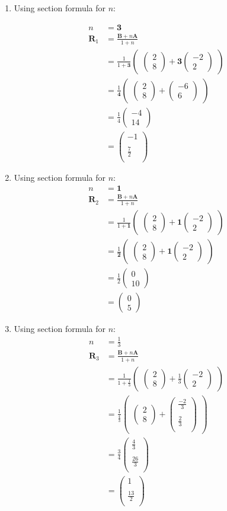 \documentclass[12pt]{article}
\newcommand{\myvec}[1]{\ensuremath{\begin{pmatrix}#1\end{pmatrix}}}
\let\vec\mathbf
\begin{document}
\begin{enumerate}

\item Using section formula for $n$:
    
\begin{align}
n&=\vec{3}\\
\vec{R}_1&=\frac{\vec{B}+n\vec{A}}{1+n}\\
&=\frac{1}{1+\vec{3}}  \myvec{\myvec{
2\\
8
}
  +
   \vec{3}\myvec{
-2\\
2
}}\\
&= \frac{1}{\vec{4}} \myvec{\myvec{
2\\
8
}
  +
\myvec{
-6\\
6
}} \\
&=\frac{1}{4}
\myvec{
-4\\
14
}\\
&=\myvec{
-1\\
\\
\frac{7}{2}\\
}
\end{align}

\item Using section formula for $n$:
\begin{align}
n&=\vec{1}\\
\vec{R}_2&=\frac{\vec{B}+n\vec{A}}{1+n}\\
&=\frac{1}{1+\vec{1}}  \myvec{\myvec{
2\\
8
}
  +
   \vec{1}\myvec{
-2\\
2
}}\\
&= \frac{1}{\vec{2}} \myvec{\myvec{
2\\
8
}
  +
\vec{1}\myvec{
-2\\
2
}} \\
&=\frac{1}{2}
\myvec{
0\\
10
}\\
&=\myvec{
0\\
5
}
\end{align}

\item Using section formula for $n$:
\begin{align}
n&=\frac{1}{3}\\
\vec{R}_3&=\frac{\vec{B}+n\vec{A}}{1+n}\\
&=\frac{1}{1+\frac{1}{3}}  \myvec{\myvec{
2\\
8
}
  +
   \frac{1}{3}\myvec{
-2\\
2
}}\\
&= \frac{1}{\frac{4}{3}} \myvec{\myvec{
2\\
8
}
  +
\myvec{
\frac{-2}{3}\\
\\
\frac{2}{3}\\
}} \\
&=\frac{3}{4}
\myvec{
\frac{4}{3}\\
\\
\frac{26}{3}\\
}\\
&=\myvec{
1\\
\\
\frac{13}{2}\\
}
\end{align}

\end{enumerate}
\end{document}
